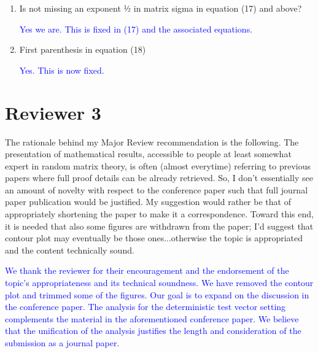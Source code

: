 \documentclass[11pt]{article}
\begin{document}
\begin{enumerate}
\begin{enumerate}
  \item Is not missing an exponent ½ in matrix sigma in equation (17) and above?

    \textcolor{blue}{Yes we are. This is fixed in (17) and the associated equations.}

  \item First parenthesis in equation (18)

    \textcolor{blue}{Yes. This is now fixed.}

  \end{enumerate}
\end{enumerate}


\section*{Reviewer 3}
The rationale behind my Major Review recommendation is the following. The presentation of mathematical results, accessible to people at least somewhat expert in random matrix theory, is often (almost everytime) referring to previous papers where full proof details can be already retrieved. So, I don't essentially see an amount of novelty with respect to the conference paper such that full journal paper publication would be justified. My suggestion would rather be that of appropriately shortening the paper to make it a correspondence. Toward this end, it is needed that also some figures are withdrawn from the paper; I'd suggest that contour plot may eventually be those ones...otherwise the topic is appropriated and the content technically sound.


\textcolor{blue}{We thank the reviewer for their encouragement and the endorsement of the topic's appropriateness and its technical soundness. We have removed the contour plot and trimmed some of the figures. Our goal is to expand on the discussion in the conference paper. The analysis for the deterministic test vector setting complements the material in the aforementioned conference paper. We believe that the unification of the analysis justifies the length and consideration of the submission as a journal paper. }
\end{document}
